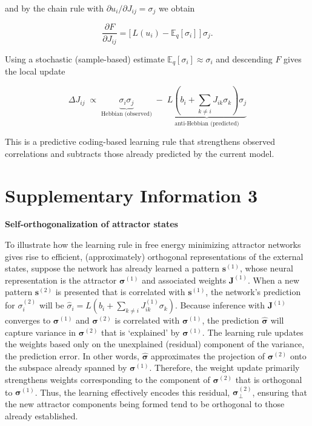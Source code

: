 \documentclass{article}
\begin{document}
and by the chain rule with $\partial u_i/\partial J_{ij}=\sigma_j$ we obtain

\begin{equation}
\frac{\partial F}{\partial J_{ij}} = \big[\,L(u_i) - \mathbb{E}_q[\sigma_i] \,\big] \, \sigma_j.
\end{equation}

Using a stochastic (sample-based) estimate $\mathbb{E}_q[\sigma_i]\approx\sigma_i$ and descending $F$ gives the local update

\begin{equation}
\boxed{\;\Delta J_{ij} \;\propto\; \underbrace{\sigma_i\sigma_j}_{\text{Hebbian (observed)}} \;-\; \underbrace{L\!\left(b_i+\sum_{k\ne i} J_{ik}\sigma_k\right)\sigma_j}_{\text{anti-Hebbian (predicted)}}\;}
\end{equation}

This is a predictive coding-based learning rule that strengthens observed correlations and subtracts those already predicted by the current model.

\section{Supplementary Information 3}

\textbf{Self-orthogonalization of attractor states}

To illustrate how the learning rule in free energy minimizing attractor networks gives rise to efficient, (approximately) orthogonal representations of the external states, suppose the network has already learned a pattern $\mathbf{s}^{(1)}$, whose neural representation is the attractor $\boldsymbol{\sigma}^{(1)}$ and associated weights $\mathbf{J}^{(1)}$. When a new pattern $\mathbf{s}^{(2)}$ is presented that is correlated with $\mathbf{s}^{(1)}$, the network's prediction for $\sigma_i^{(2)}$ will be $\hat{\sigma}_i = L(b_i + \sum_{k \neq i} J_{ik}^{(1)} \sigma_k)$. Because inference with $\mathbf{J}^{(1)}$ converges to $\boldsymbol{\sigma}^{(1)}$ and $\boldsymbol{\sigma}^{(2)}$ is correlated with $\boldsymbol{\sigma}^{(1)}$, the prediction $\hat{\boldsymbol{\sigma}}$ will capture variance in $\boldsymbol{\sigma}^{(2)}$ that is `explained' by $\boldsymbol{\sigma}^{(1)}$.
The learning rule updates the weights based only on the unexplained (residual) component of the variance, the prediction error. In other words, $\hat{\boldsymbol{\sigma}}$ approximates the projection of $\boldsymbol{\sigma}^{(2)}$ onto the subspace already spanned by $\boldsymbol{\sigma}^{(1)}$. Therefore, the weight update primarily strengthens weights corresponding to the component of $\boldsymbol{\sigma}^{(2)}$ that is orthogonal to $\boldsymbol{\sigma}^{(1)}$.
Thus, the learning effectively encodes this residual, $\boldsymbol{\sigma}^{(2)}_{\perp}$, ensuring that the new attractor components being formed tend to be orthogonal to those already established.
\end{document}
